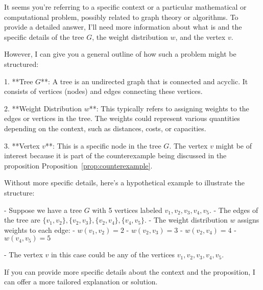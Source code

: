 It seems you're referring to a specific context or a particular mathematical or computational problem, possibly related to graph theory or algorithms. To provide a detailed answer, I'll need more information about what  is and the specific details of the tree \( G \), the weight distribution \( w \), and the vertex \( v \).

However, I can give you a general outline of how such a problem might be structured:

1. **Tree \( G \)**: A tree is an undirected graph that is connected and acyclic. It consists of vertices (nodes) and edges connecting these vertices.

2. **Weight Distribution \( w \)**: This typically refers to assigning weights to the edges or vertices in the tree. The weights could represent various quantities depending on the context, such as distances, costs, or capacities.

3. **Vertex \( v \)**: This is a specific node in the tree \( G \). The vertex \( v \) might be of interest because it is part of the counterexample being discussed in the proposition \(\text{Proposition}\)~\ref{prop:counterexample}.

Without more specific details, here's a hypothetical example to illustrate the structure:

- Suppose we have a tree \( G \) with 5 vertices labeled \( v_1, v_2, v_3, v_4, v_5 \).
- The edges of the tree are \( \{v_1, v_2\}, \{v_2, v_3\}, \{v_2, v_4\}, \{v_4, v_5\} \).
- The weight distribution \( w \) assigns weights to each edge:
  - \( w(v_1, v_2) = 2 \)
  - \( w(v_2, v_3) = 3 \)
  - \( w(v_2, v_4) = 4 \)
  - \( w(v_4, v_5) = 5 \)

- The vertex \( v \) in this case could be any of the vertices \( v_1, v_2, v_3, v_4, v_5 \).

If you can provide more specific details about the context and the proposition, I can offer a more tailored explanation or solution.